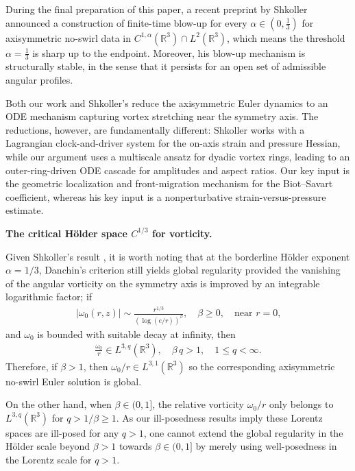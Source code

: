 \documentclass[reqno,11pt]{amsart}
\begin{document}
During the final preparation of this paper,  a recent preprint by Shkoller \cite{Shkoller26} announced
a construction of finite-time blow-up for every $\alpha\in(0,\frac{1}{3})$ for axisymmetric no-swirl
data in $C^{1,\alpha}(\mathbb{R}^3)\cap L^2(\mathbb{R}^3)$, which means the
threshold $\alpha=\frac{1}{3}$ is sharp up to the endpoint. Moreover, his blow-up
mechanism is structurally stable, in the sense that it persists for an open set of admissible angular profiles.

Both our work and Shkoller's reduce the axisymmetric Euler dynamics to an ODE mechanism capturing vortex stretching near the symmetry axis. The reductions, however, are fundamentally different: Shkoller works with a Lagrangian clock-and-driver system for the on-axis strain and pressure Hessian, while our argument uses a multiscale ansatz for dyadic vortex rings, leading to an outer-ring-driven ODE cascade for amplitudes and aspect ratios. Our key input is the geometric localization and front-migration mechanism for the Biot--Savart coefficient, whereas his key input is a nonperturbative strain-versus-pressure estimate.

\medskip
\noindent\textbf{The critical H\"older space $C^{1/3}$ for vorticity.}

Given Shkoller's result \cite{Shkoller26}, it is worth noting that at the borderline H\"older exponent $\alpha=1/3$, Danchin's criterion still yields global regularity provided the vanishing of the angular vorticity on the symmetry axis is improved by an integrable logarithmic factor; if
    \begin{align*}
        |\omega_0(r,z)| \sim  \frac{r^{1/3}}{(\log(e/r))^{\beta}}, \quad \beta\geq 0, \quad \text{near $r=0$,}
    \end{align*}
 and $\omega_0$ is bounded with suitable decay at infinity, then 
    \begin{align*}
        \frac{\omega_0}{r}\in L^{3,q}(\mathbb{R}^3), \quad \beta \, q>1, \quad 1\leq q<\infty.
    \end{align*}
Therefore, if $\beta>1$, then $\omega_0/r\in L^{3,1}(\mathbb{R}^3)$ so
the corresponding axisymmetric no-swirl Euler solution is global. 

On the other hand, when $\beta\in (0,1]$, the relative vorticity $\omega_0/r$ only belongs to $L^{3,q}(\mathbb{R}^3)$ for $q>1/\beta\geq 1.$ As our ill-posedness results imply these Lorentz spaces are ill-posed for any $q>1$, one cannot extend the global regularity in the H\"older scale beyond $\beta>1$ towards $\beta\in(0,1]$ by merely using well-posedness in the Lorentz scale for $q>1$.
\end{document}
